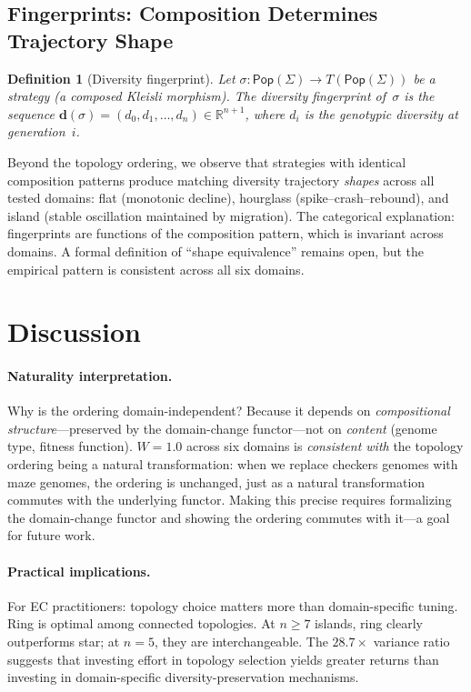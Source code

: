 \documentclass[submission,copyright,creativecommons]{eptcs}
\newtheorem{definition}{Definition}
\begin{document}
\subsection{Fingerprints: Composition Determines Trajectory Shape}

\begin{definition}[Diversity fingerprint]
\label{def:fingerprint}
Let $\sigma : \mathsf{Pop}(\Sigma) \to T(\mathsf{Pop}(\Sigma))$ be a
strategy (a composed Kleisli morphism). The \emph{diversity fingerprint}
of~$\sigma$ is the sequence
$\mathbf{d}(\sigma) = (d_0, d_1, \ldots, d_n) \in \mathbb{R}^{n+1}$,
where $d_i$ is the genotypic diversity at generation~$i$.
\end{definition}

Beyond the topology ordering, we observe that strategies with
identical composition patterns produce matching diversity trajectory
\emph{shapes} across all tested domains: flat (monotonic decline),
hourglass (spike--crash--rebound), and island (stable oscillation
maintained by migration).
The categorical explanation: fingerprints are functions of the
composition pattern, which is invariant across domains. A formal
definition of ``shape equivalence'' remains open, but the empirical
pattern is consistent across all six domains.

\section{Discussion}
\label{sec:discussion}

\paragraph{Naturality interpretation.}
Why is the ordering domain-independent? Because it depends on
\emph{compositional structure}---preserved by the domain-change
functor---not on \emph{content} (genome type, fitness function).
$W = 1.0$ across six domains is \emph{consistent with} the topology
ordering being a natural transformation: when we replace checkers
genomes with maze genomes, the ordering is unchanged, just as a
natural transformation commutes with the underlying functor.
Making this precise requires formalizing the domain-change functor
and showing the ordering commutes with it---a goal for future work.

\paragraph{Practical implications.}
For EC practitioners: topology choice matters more than
domain-specific tuning. Ring is optimal among connected topologies.
At $n \geq 7$ islands, ring clearly outperforms star; at $n{=}5$,
they are interchangeable. The $28.7\times$ variance ratio suggests
that investing effort in topology selection yields greater returns
than investing in domain-specific diversity-preservation mechanisms.
\end{document}
